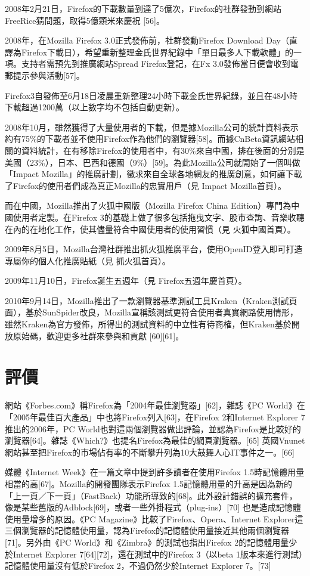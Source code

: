 \documentclass[12pt, a4paper, twoside]{article}
\begin{document}
2008年2月21日，Firefox的下載數量到達了5億次，Firefox的社群發動到網站FreeRice猜問題，取得5億顆米來慶祝 [56]。

2008年，在Mozilla Firefox 3.0正式發佈前，社群發動Firefox Download Day（直譯為Firefox下載日），希望重新整理金氏世界紀錄中「單日最多人下載軟體」的一項。支持者需預先到推廣網站Spread Firefox登記，在Fx 3.0發佈當日便會收到電郵提示參與活動[57]。

Firefox3自發佈至6月18日凌晨重新整理24小時下載金氏世界紀錄，並且在48小時下載超過1200萬（以上數字均不包括自動更新）。

2008年10月，雖然獲得了大量使用者的下載，但是據Mozilla公司的統計資料表示約有75\%的下載者並不使用Firefox作為他們的瀏覽器[58]。而據CnBeta資訊網站相關的資料統計，在有移除Firefox的使用者中，有30\%來自中國，排在後面的分別是美國（23\%），日本、巴西和德國（9\%）[59]。為此Mozilla公司就開始了一個叫做「Impact Mozilla」的推廣計劃，徵求來自全球各地網友的推廣創意，如何讓下載了Firefox的使用者們成為真正Mozilla的忠實用戶（見 Impact Mozilla首頁）。

而在中國，Mozilla推出了火狐中國版（Mozilla Firefox China Edition）專門為中國使用者定製。在Firefox 3的基礎上做了很多包括拖曳文字、股市查詢、音樂收聽在內的在地化工作，使其儘量符合中國使用者的使用習慣（見 火狐中國首頁）。

2009年8月5日，Mozilla台灣社群推出抓火狐推廣平台，使用OpenID登入即可打造專屬你的個人化推廣貼紙（見 抓火狐首頁）。

2009年11月10日，Firefox誕生五週年（見 Firefox五週年慶首頁）。

2010年9月14日，Mozilla推出了一款瀏覽器基準測試工具Kraken（Kraken測試頁面），基於SunSpider改良，Mozilla宣稱該測試更符合使用者真實網路使用情形，雖然Kraken為官方發佈，所得出的測試資料的中立性有待商榷，但Kraken基於開放原始碼，歡迎更多社群來參與和貢獻 [60][61]。

\section{評價}

網站《Forbes.com》稱Firefox為「2004年最佳瀏覽器」[62]，雜誌《PC World》在「2005年最佳百大產品」中也將Firefox列入[63]，在Firefox 2和Internet Explorer 7推出的2006年，PC World也對這兩個瀏覽器做出評論，並認為Firefox是比較好的瀏覽器[64]。雜誌《Which?》也提名Firefox為最佳的網頁瀏覽器。[65] 英國Vnunet網站甚至把Firefox的市場佔有率的不斷攀升列為10大鼓舞人心IT事件之一。[66]

媒體《Internet Week》在一篇文章中提到許多讀者在使用Firefox 1.5時記憶體用量相當的高[67]。Mozilla的開發團隊表示Firefox 1.5記憶體用量的升高是因為新的「上一頁／下一頁」（FastBack）功能所導致的[68]。此外設計錯誤的擴充套件，像是某些舊版的Adblock[69]，或者一些外掛程式（plug-ins）[70] 也是造成記憶體使用量增多的原因。《PC Magazine》比較了Firefox、Opera、Internet Explorer這三個瀏覽器的記憶體使用量，認為Firefox的記憶體使用量接近其他兩個瀏覽器[71]。另外由《PC World》和《Zimbra》的測試也指出Firefox 2的記憶體用量少於Internet Explorer 7[64][72]，還在測試中的Firefox 3（以beta 1版本來進行測試）記憶體使用量沒有低於Firefox 2，不過仍然少於Internet Explorer 7。[73]
\end{document}
